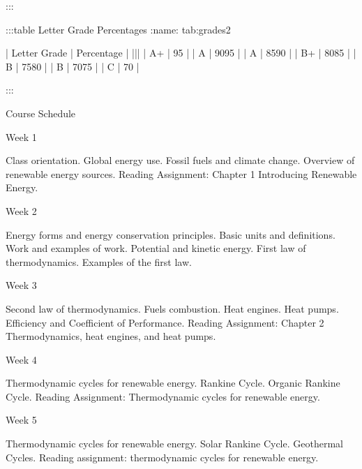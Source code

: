 \documentclass[letterpaper,10pt,english]{jupyterBook}
\begin{document}
\begin{sphinxVerbatim}[commandchars=\\\{\}]
:::

:::\PYGZob{}table\PYGZcb{} Letter Grade Percentages
:name: tab:grades2

| Letter Grade   | Percentage       |
|\PYGZhy{}\PYGZhy{}\PYGZhy{}\PYGZhy{}\PYGZhy{}\PYGZhy{}\PYGZhy{}\PYGZhy{}\PYGZhy{}\PYGZhy{}\PYGZhy{}\PYGZhy{}\PYGZhy{}\PYGZhy{}\PYGZhy{}\PYGZhy{}|\PYGZhy{}\PYGZhy{}\PYGZhy{}\PYGZhy{}\PYGZhy{}\PYGZhy{}\PYGZhy{}\PYGZhy{}\PYGZhy{}\PYGZhy{}\PYGZhy{}\PYGZhy{}\PYGZhy{}\PYGZhy{}\PYGZhy{}\PYGZhy{}\PYGZhy{}\PYGZhy{}|
| A+             | \PYGZgt{}95\PYGZpc{}            |
| A              | 90\PYGZhy{}95\PYGZpc{}          |
| A\PYGZhy{}             | 85\PYGZhy{}90\PYGZpc{}          |
| B+             | 80\PYGZhy{}85\PYGZpc{}          |
| B              | 75\PYGZhy{}80\PYGZpc{}          |
| B\PYGZhy{}             | 70\PYGZhy{}75\PYGZpc{}          |
| C              | \PYGZlt{}70\PYGZpc{}            |

:::


\PYGZsh{}\PYGZsh{} Course Schedule

\PYGZsh{}\PYGZsh{}\PYGZsh{} Week 1

\PYGZhy{}   Class orientation.
\PYGZhy{}   Global energy use.
\PYGZhy{}   Fossil fuels and climate change.
\PYGZhy{}   Overview of renewable energy sources.
\PYGZhy{}   Reading Assignment: Chapter 1 \PYGZhy{} Introducing Renewable Energy.

\PYGZsh{}\PYGZsh{}\PYGZsh{} Week 2

\PYGZhy{}   Energy forms and energy conservation principles.
\PYGZhy{}   Basic units and definitions.
\PYGZhy{}   Work and examples of work.
\PYGZhy{}   Potential and kinetic energy.
\PYGZhy{}   First law of thermodynamics.
\PYGZhy{}   Examples of the first law.

\PYGZsh{}\PYGZsh{}\PYGZsh{} Week 3

\PYGZhy{}   Second law of thermodynamics.
\PYGZhy{}   Fuels \PYGZam{} combustion.
\PYGZhy{}   Heat engines.
\PYGZhy{}   Heat pumps.
\PYGZhy{}   Efficiency and Coefficient of Performance.
\PYGZhy{}   Reading Assignment: Chapter 2 \PYGZhy{} Thermodynamics, heat engines, and
    heat pumps.

\PYGZsh{}\PYGZsh{}\PYGZsh{} Week 4

\PYGZhy{}   Thermodynamic cycles for renewable energy.
\PYGZhy{}   Rankine Cycle.
\PYGZhy{}   Organic Rankine Cycle.
\PYGZhy{}   Reading Assignment: \PYGZhy{} Thermodynamic cycles for renewable energy.

\PYGZsh{}\PYGZsh{}\PYGZsh{} Week 5

\PYGZhy{}   Thermodynamic cycles for renewable energy.
\PYGZhy{}   Solar Rankine Cycle.
\PYGZhy{}   Geothermal Cycles.
\PYGZhy{}   Reading assignment: thermodynamic cycles for renewable energy.


\end{sphinxVerbatim}
\end{document}
